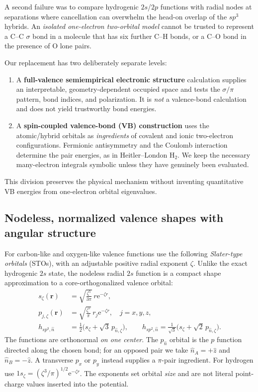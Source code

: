 \documentclass[11pt,letterpaper]{article}
\newcommand{\e}{\mathrm e}
\begin{document}
A second failure was to compare hydrogenic $2s$/$2p$ functions with radial nodes at separations where cancellation can overwhelm the head-on overlap of the $sp^3$ hybrids. An \emph{isolated one-electron two-orbital model} cannot be trusted to represent a C--C $\sigma$ bond in a molecule that has six further C--H bonds, or a C--O bond in the presence of O lone pairs.

Our replacement has two deliberately separate levels:
\begin{enumerate}
\item A \textbf{full-valence semiempirical electronic structure} calculation supplies an interpretable, geometry-dependent occupied space and tests the $\sigma/\pi$ pattern, bond indices, and polarization. It is \emph{not} a valence-bond calculation and does not yield trustworthy bond energies.
\item A \textbf{spin-coupled valence-bond (VB) construction} uses the atomic/hybrid orbitals as \emph{ingredients} of covalent and ionic two-electron configurations. Fermionic antisymmetry and the Coulomb interaction determine the pair energies, as in Heitler--London $\mathrm H_2$. We keep the necessary many-electron integrals symbolic unless they have genuinely been evaluated.
\end{enumerate}
This division preserves the physical mechanism without inventing quantitative VB energies from one-electron orbital eigenvalues.

\subsection{Nodeless, normalized valence shapes with angular structure}
For carbon-like and oxygen-like valence functions use the following \emph{Slater-type orbitals} (STOs), with an adjustable positive radial exponent $\zeta$. Unlike the exact hydrogenic $2s$ state, the nodeless radial $2s$ function is a compact shape approximation to a core-orthogonalized valence orbital:
\begin{equation}\label{eq:sto-valence}
\boxed{\begin{aligned}
s_\zeta(\mathbf r)&=\sqrt{\frac{\zeta^5}{3\pi}}\,r\e^{-\zeta r},\\
p_{j,\zeta}(\mathbf r)&=\sqrt{\frac{\zeta^5}{\pi}}\,r_j\e^{-\zeta r},\quad j=x,y,z,\\
h_{sp^3,\hat n}&=\tfrac12\bigl(s_\zeta+\sqrt3\,p_{\hat n,\zeta}\bigr),\qquad
h_{sp^2,\hat n}=\tfrac1{\sqrt3}\bigl(s_\zeta+\sqrt2\,p_{\hat n,\zeta}\bigr).
\end{aligned}}
\end{equation}
The functions are orthonormal \emph{on one center}. The $p_{\hat n}$ orbital is the $p$ function directed along the chosen bond; for an opposed pair we take $\hat n_A=+\hat z$ and $\hat n_B=-\hat z$. A transverse $p_x$ or $p_y$ instead supplies a $\pi$-pair ingredient. For hydrogen use $1s_\zeta=(\zeta^3/\pi)^{1/2}\e^{-\zeta r}$. The exponents set orbital \emph{size} and are not literal point-charge values inserted into the potential.
\end{document}
